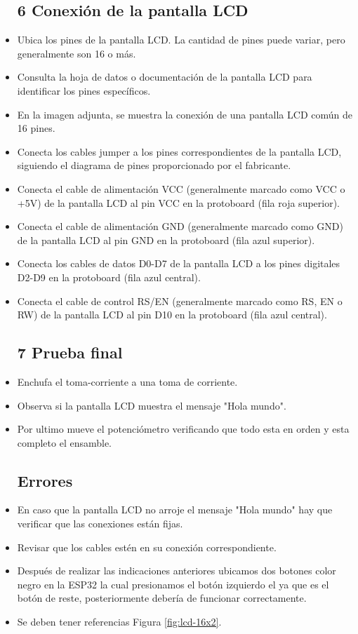 \begin{itemize}
         \subsection{6 Conexión de la pantalla LCD}
        \item Ubica los pines de la pantalla LCD. La cantidad de pines puede variar, pero generalmente son 16 o más.
        \item Consulta la hoja de datos o documentación de la pantalla LCD para identificar los pines específicos.
        \item En la imagen adjunta, se muestra la conexión de una pantalla LCD común de 16 pines.
        \item Conecta los cables jumper a los pines correspondientes de la pantalla LCD, siguiendo el diagrama de pines proporcionado por el fabricante.
        \item Conecta el cable de alimentación VCC (generalmente marcado como VCC o +5V) de la pantalla LCD al pin VCC en la protoboard (fila roja superior).
         \item Conecta el cable de alimentación GND (generalmente marcado como GND) de la pantalla LCD al pin GND en la protoboard (fila azul superior).
          \item Conecta los cables de datos D0-D7 de la pantalla LCD a los pines digitales D2-D9 en la protoboard (fila azul central).
         \item Conecta el cable de control RS/EN (generalmente marcado como RS, EN o RW) de la pantalla LCD al pin D10 en la protoboard (fila azul central).
    
         \subsection{7 Prueba final }
        \item Enchufa el toma-corriente a una toma de corriente.
        \item Observa si la pantalla LCD muestra el mensaje "Hola mundo".
        \item Por ultimo mueve el potenciómetro verificando que todo esta en orden y esta completo el ensamble.
    
        \subsection{Errores}
        \item En caso que la pantalla LCD no arroje el mensaje "Hola mundo" hay que verificar que las conexiones están fijas.
        \item Revisar que los cables estén en su conexión correspondiente.
         \item Después de realizar las indicaciones anteriores ubicamos dos botones color negro en la ESP32 la cual presionamos el botón izquierdo el ya que es el botón de reste, posteriormente debería de funcionar correctamente.
    
        
        \item Se deben tener referencias Figura \ref{fig:lcd-16x2}.
    \end{itemize}
